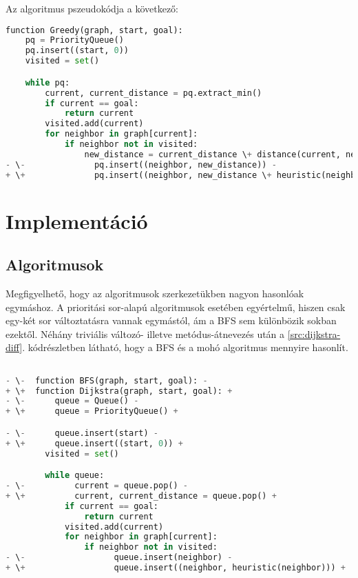 Az algoritmus pszeudokódja a következő: \\

\begin{minipage}{\textwidth}
\begin{lstlisting}[language={Python}, style=gitdiff]
function Greedy(graph, start, goal):
    pq = PriorityQueue()
    pq.insert((start, 0))
    visited = set()

    while pq:
        current, current_distance = pq.extract_min()
        if current == goal:
            return current
        visited.add(current)
        for neighbor in graph[current]:
            if neighbor not in visited:
                new_distance = current_distance \+ distance(current, neighbor)
- \-              pq.insert((neighbor, new_distance)) -
+ \+              pq.insert((neighbor, new_distance \+ heuristic(neighbor))) +
\end{lstlisting}
\end{minipage}

\section{Implementáció}

\subsection{Algoritmusok}

Megfigyelhető, hogy az algoritmusok szerkezetükben nagyon hasonlóak egymáshoz. A prioritási sor-alapú algoritmusok esetében egyértelmű, hiszen csak egy-két sor változtatásra vannak egymástól, ám a BFS sem különbözik sokban ezektől. Néhány triviális változó- illetve metódus-átnevezés után a \ref{src:dijkstra-diff}. kódrészletben látható, hogy a BFS és a mohó algoritmus mennyire hasonlít. \\

\begin{minipage}{\textwidth}
\begin{lstlisting}[language={Python}, style=gitdiff]

- \-  function BFS(graph, start, goal): -
+ \+  function Dijkstra(graph, start, goal): +
- \-      queue = Queue() -
+ \+      queue = PriorityQueue() +

- \-      queue.insert(start) -
+ \+      queue.insert((start, 0)) +
        visited = set()

        while queue:
- \-          current = queue.pop() -
+ \+          current, current_distance = queue.pop() +
            if current == goal:
                return current
            visited.add(current)
            for neighbor in graph[current]:
                if neighbor not in visited:
- \-                  queue.insert(neighbor) -
+ \+                  queue.insert((neighbor, heuristic(neighbor))) +
\end{lstlisting}
\end{minipage}

